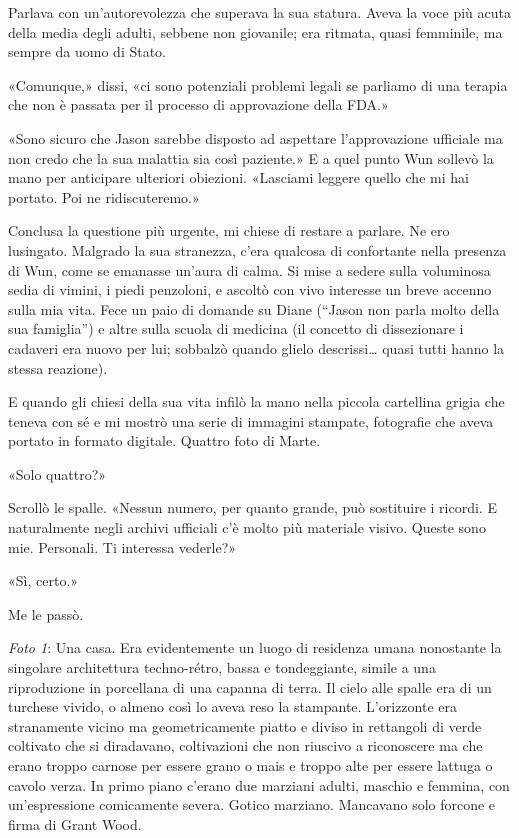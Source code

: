Parlava con un'autorevolezza che superava la sua statura. Aveva la voce
più acuta della media degli adulti, sebbene non giovanile; era ritmata,
quasi femminile, ma sempre da uomo di Stato.

«Comunque,» dissi, «ci sono potenziali problemi legali se parliamo di
una terapia che non è passata per il processo di approvazione della
FDA.»

«Sono sicuro che Jason sarebbe disposto ad aspettare l'approvazione
ufficiale ma non credo che la sua malattia sia così paziente.» E a quel
punto Wun sollevò la mano per anticipare ulteriori obiezioni. «Lasciami
leggere quello che mi hai portato. Poi ne ridiscuteremo.»

Conclusa la questione più urgente, mi chiese di restare a parlare. Ne
ero lusingato. Malgrado la sua stranezza, c'era qualcosa di confortante
nella presenza di Wun, come se emanasse un'aura di calma. Si mise a
sedere sulla voluminosa sedia di vimini, i piedi penzoloni, e ascoltò
con vivo interesse un breve accenno sulla mia vita. Fece un paio di
domande su Diane (``Jason non parla molto della sua famiglia'') e altre
sulla scuola di medicina (il concetto di dissezionare i cadaveri era
nuovo per lui; sobbalzò quando glielo descrissi\ldots{} quasi tutti
hanno la stessa reazione).

E quando gli chiesi della sua vita infilò la mano nella piccola
cartellina grigia che teneva con sé e mi mostrò una serie di immagini
stampate, fotografie che aveva portato in formato digitale. Quattro foto
di Marte.

«Solo quattro?»

Scrollò le spalle. «Nessun numero, per quanto grande, può sostituire i
ricordi. E naturalmente negli archivi ufficiali c'è molto più materiale
visivo. Queste sono mie. Personali. Ti interessa vederle?»

«Sì, certo.»

Me le passò.

\emph{Foto 1}: Una casa. Era evidentemente un luogo di residenza umana
nonostante la singolare architettura techno-rétro, bassa e tondeggiante,
simile a una riproduzione in porcellana di una capanna di terra. Il
cielo alle spalle era di un turchese vivido, o almeno così lo aveva reso
la stampante. L'orizzonte era stranamente vicino ma geometricamente
piatto e diviso in rettangoli di verde coltivato che si diradavano,
coltivazioni che non riuscivo a riconoscere ma che erano troppo carnose
per essere grano o mais e troppo alte per essere lattuga o cavolo verza.
In primo piano c'erano due marziani adulti, maschio e femmina, con
un'espressione comicamente severa. Gotico marziano. Mancavano solo
forcone e firma di Grant Wood.

